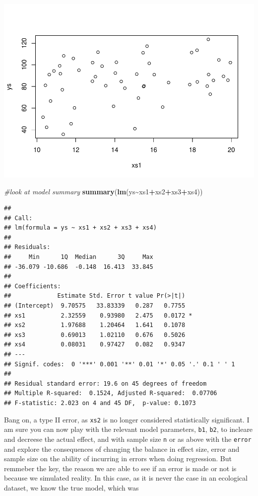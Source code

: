 \documentclass[
]{book}
\newenvironment{Shaded}{\begin{snugshade}}{\end{snugshade}}
\newcommand{\CommentTok}[1]{\textcolor[rgb]{0.56,0.35,0.01}{\textit{#1}}}
\newcommand{\FunctionTok}[1]{\textcolor[rgb]{0.13,0.29,0.53}{\textbf{#1}}}
\newcommand{\NormalTok}[1]{#1}
\newcommand{\SpecialCharTok}[1]{\textcolor[rgb]{0.81,0.36,0.00}{\textbf{#1}}}
\begin{document}
\includegraphics{ECOMODbook_files/figure-latex/a7.7-1.pdf}

\begin{Shaded}
\begin{Highlighting}[]
\CommentTok{\#look at model summary}
\FunctionTok{summary}\NormalTok{(}\FunctionTok{lm}\NormalTok{(ys}\SpecialCharTok{\textasciitilde{}}\NormalTok{xs1}\SpecialCharTok{+}\NormalTok{xs2}\SpecialCharTok{+}\NormalTok{xs3}\SpecialCharTok{+}\NormalTok{xs4))}
\end{Highlighting}
\end{Shaded}

\begin{verbatim}
## 
## Call:
## lm(formula = ys ~ xs1 + xs2 + xs3 + xs4)
## 
## Residuals:
##     Min      1Q  Median      3Q     Max 
## -36.079 -10.686  -0.148  16.413  33.845 
## 
## Coefficients:
##             Estimate Std. Error t value Pr(>|t|)  
## (Intercept)  9.70575   33.83339   0.287   0.7755  
## xs1          2.32559    0.93980   2.475   0.0172 *
## xs2          1.97688    1.20464   1.641   0.1078  
## xs3          0.69013    1.02110   0.676   0.5026  
## xs4          0.08031    0.97427   0.082   0.9347  
## ---
## Signif. codes:  0 '***' 0.001 '**' 0.01 '*' 0.05 '.' 0.1 ' ' 1
## 
## Residual standard error: 19.6 on 45 degrees of freedom
## Multiple R-squared:  0.1524, Adjusted R-squared:  0.07706 
## F-statistic: 2.023 on 4 and 45 DF,  p-value: 0.1073
\end{verbatim}

Bang on, a type II error, as \texttt{xs2} is no longer considered statistically significant. I am sure you can now play with the relevant model parameters, \texttt{b1}, \texttt{b2}, to incleare and decreese the actual effect, and with sample size \texttt{n} or as above with the \texttt{error} and explore the consequences of changing the balance in effect size, error and sample size on the ability of incurring in errors when doing regression. But remmeber the key, the reason we are able to see if an error is made or not is because we simulated reality. In this case, as it is never the case in an ecological dataset, we know the true model, which was
\end{document}
